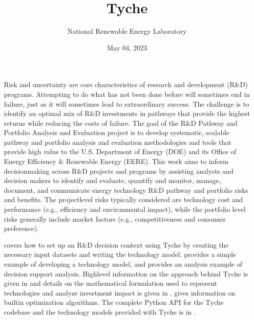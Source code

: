 \documentclass[letterpaper,10pt,english]{sphinxmanual}
\title{Tyche}
\date{May 04, 2023}
\author{National Renewable Energy Laboratory}
\begin{document}
\pagestyle{empty}
\sphinxmaketitle
\pagestyle{plain}
\sphinxtableofcontents
\pagestyle{normal}
\label{\detokenize{index::doc}}


\sphinxAtStartPar
Risk and uncertainty are core characteristics of research and development (R\&D) programs. Attempting to do what has not been done before will sometimes end in failure, just as it will sometimes lead to extraordinary success. The challenge is to identify an optimal mix of R\&D investments in pathways that provide the highest returns while reducing the costs of failure. The goal of the R\&D Pathway and Portfolio Analysis and Evaluation project is to develop systematic, scalable pathway and portfolio analysis and evaluation methodologies and tools that provide high value to the U.S. Department of Energy (DOE) and its Office of Energy Efficiency \& Renewable Energy (EERE). This work aims to inform decision\sphinxhyphen{}making across R\&D projects and programs by assisting analysts and decision makers to identify and evaluate, quantify and monitor, manage, document, and communicate energy technology R\&D pathway and portfolio risks and benefits. The project\sphinxhyphen{}level risks typically considered are technology cost and performance (e.g., efficiency and environmental impact), while the portfolio level risks generally include market factors (e.g., competitiveness and consumer preference).

\sphinxAtStartPar
{\hyperref[\detokenize{cheat-sheet:sec-quickstart}]{}} covers how to set up an R\&D decision context using Tyche by creating the necessary input datasets and writing the technology model. {\hyperref[\detokenize{example-technology:sec-techmodelexample}]{}} provides a simple example of developing a technology model, and {\hyperref[\detokenize{example-analysis:sec-analysisexample}]{}} provides an analysis example of decision support analysis. High\sphinxhyphen{}level information on the approach behind Tyche is given in {\hyperref[\detokenize{approach:sec-approach}]{}} and details on the mathematical formulation used to represent technologies and analyze investment impact is given in {\hyperref[\detokenize{formulation:sec-formulation}]{}}. {\hyperref[\detokenize{optimizers:sec-optimizers}]{}} gives information on built\sphinxhyphen{}in optimization algorithms. The complete Python API for the Tyche codebase and the technology models provided with Tyche is in {\hyperref[\detokenize{modules:sec-modules}]{}}.
\end{document}
